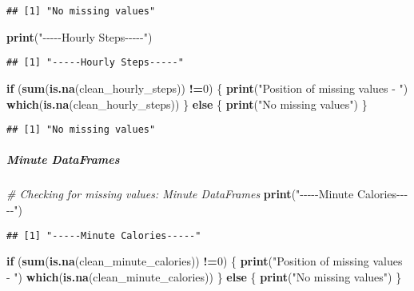 \documentclass[
]{article}
\newenvironment{Shaded}{\begin{snugshade}}{\end{snugshade}}
\newcommand{\CommentTok}[1]{\textcolor[rgb]{0.56,0.35,0.01}{\textit{#1}}}
\newcommand{\ControlFlowTok}[1]{\textcolor[rgb]{0.13,0.29,0.53}{\textbf{#1}}}
\newcommand{\DecValTok}[1]{\textcolor[rgb]{0.00,0.00,0.81}{#1}}
\newcommand{\FunctionTok}[1]{\textcolor[rgb]{0.13,0.29,0.53}{\textbf{#1}}}
\newcommand{\NormalTok}[1]{#1}
\newcommand{\SpecialCharTok}[1]{\textcolor[rgb]{0.81,0.36,0.00}{\textbf{#1}}}
\newcommand{\StringTok}[1]{\textcolor[rgb]{0.31,0.60,0.02}{#1}}
\begin{document}
\begin{verbatim}
## [1] "No missing values"
\end{verbatim}

\begin{Shaded}
\begin{Highlighting}[]
\FunctionTok{print}\NormalTok{(}\StringTok{"{-}{-}{-}{-}{-}Hourly Steps{-}{-}{-}{-}{-}"}\NormalTok{)}
\end{Highlighting}
\end{Shaded}

\begin{verbatim}
## [1] "-----Hourly Steps-----"
\end{verbatim}

\begin{Shaded}
\begin{Highlighting}[]
\ControlFlowTok{if}\NormalTok{ (}\FunctionTok{sum}\NormalTok{(}\FunctionTok{is.na}\NormalTok{(clean\_hourly\_steps)) }\SpecialCharTok{!=}\DecValTok{0}\NormalTok{) \{}
  \FunctionTok{print}\NormalTok{(}\StringTok{"Position of missing values {-} "}\NormalTok{)}
  \FunctionTok{which}\NormalTok{(}\FunctionTok{is.na}\NormalTok{(clean\_hourly\_steps))}
\NormalTok{\} }\ControlFlowTok{else}\NormalTok{ \{}
  \FunctionTok{print}\NormalTok{(}\StringTok{"No missing values"}\NormalTok{)}
\NormalTok{\}}
\end{Highlighting}
\end{Shaded}

\begin{verbatim}
## [1] "No missing values"
\end{verbatim}

\hypertarget{minute-dataframes-4}{%
\subparagraph{Minute DataFrames}\label{minute-dataframes-4}}

\begin{Shaded}
\begin{Highlighting}[]
\CommentTok{\# Checking for missing values: Minute DataFrames}
\FunctionTok{print}\NormalTok{(}\StringTok{"{-}{-}{-}{-}{-}Minute Calories{-}{-}{-}{-}{-}"}\NormalTok{)}
\end{Highlighting}
\end{Shaded}

\begin{verbatim}
## [1] "-----Minute Calories-----"
\end{verbatim}

\begin{Shaded}
\begin{Highlighting}[]
\ControlFlowTok{if}\NormalTok{ (}\FunctionTok{sum}\NormalTok{(}\FunctionTok{is.na}\NormalTok{(clean\_minute\_calories)) }\SpecialCharTok{!=}\DecValTok{0}\NormalTok{) \{}
  \FunctionTok{print}\NormalTok{(}\StringTok{"Position of missing values {-} "}\NormalTok{)}
  \FunctionTok{which}\NormalTok{(}\FunctionTok{is.na}\NormalTok{(clean\_minute\_calories))}
\NormalTok{\} }\ControlFlowTok{else}\NormalTok{ \{}
  \FunctionTok{print}\NormalTok{(}\StringTok{"No missing values"}\NormalTok{)}
\NormalTok{\}}
\end{Highlighting}
\end{Shaded}
\end{document}
